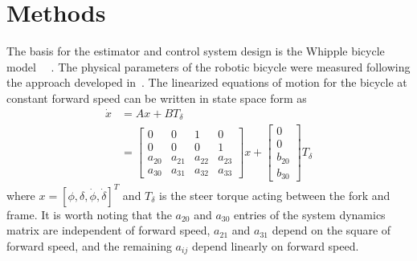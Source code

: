 \documentclass[letterpaper,11pt]{article}
\begin{document}
\section{Methods} \label{sec:methods}
The basis for the estimator and control system design is the Whipple bicycle
model~\cite{Whipple1899}~\cite{Meijaard2007} . The physical parameters of the robotic bicycle were
measured following the approach developed in~\cite{Moore2010b}.  The linearized
equations of motion for the bicycle at constant forward speed can be written in state space form as
\begin{align*}
  \dot{x} &= A x + B T_\delta \\
          &= \left[\begin{smallmatrix}0 & 0 & 1 & 0\\0 & 0 & 0 & 1\\a_{20} & a_{21} &
a_{22} & a_{23}\\a_{30} & a_{31} & a_{32} & a_{33}\end{smallmatrix}\right] x +
\left[\begin{smallmatrix}0\\0\\b_{20}\\b_{30}\end{smallmatrix}\right] T_\delta
\end{align*}
where $x = \left[\phi, \delta, \dot{\phi}, \dot{\delta}\right]^T$ and
$T_\delta$ is the steer torque acting between the fork and frame. It is
worth noting that the $a_{20}$ and $a_{30}$ entries of the system dynamics
matrix are independent of forward speed, $a_{21}$ and $a_{31}$ depend on the
square of forward speed, and the remaining $a_{ij}$ depend linearly on forward
speed.
\end{document}
